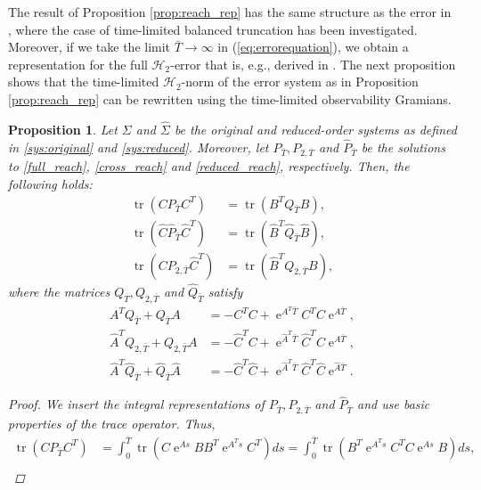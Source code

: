 \documentclass[a4paper,11pt, twoside]{article}
\newcommand{\expn}{\operatorname{e}}
\newcommand{\trace}{\operatorname{tr}}
\newtheorem{prop}[defn]{Proposition} %
\begin{document}
The result of Proposition \ref{prop:reach_rep} has the same structure as the error in \cite{redmannkuerschner}, where the case of time-limited 
balanced truncation has been investigated. Moreover, if we take the limit $\bar T\rightarrow \infty$ in (\ref{eq:errorequation}), we obtain a 
representation for the full $\mathcal{H}_2$-error that is, e.g., derived in \cite{morAnt05}. The next proposition shows that the time-limited 
$\mathcal H_2$-norm of the error system as in Proposition \ref{prop:reach_rep} can be rewritten using the time-limited observability Gramians.
\begin{prop}\label{prop:express_error_obs}
Let $\Sigma$ and $\hat \Sigma$ be the original and reduced-order systems as defined in \eqref{sys:original} and \eqref{sys:reduced}. Moreover, let 
$P_{\bar T}, P_{2, \bar T}$ and $\hat P_{\bar T}$ be the solutions to \eqref{full_reach},  \eqref{cross_reach} and \eqref{reduced_reach}, 
respectively. Then, the following holds: 
 \begin{align*}
\trace(C P_{\bar T} C^T)&=\trace(B^T Q_{\bar T} B),\\  \trace(\hat C \hat P_{\bar T} \hat C^T)&=\trace(\hat B^T \hat Q_{\bar T} \hat B),\\ 
\trace(C P_{2, \bar T} \hat C^T)&=\trace(\hat B^T Q_{2, \bar T} B),                                          
                                                             \end{align*}
 where the matrices $Q_{\bar T}, Q_{2, \bar T}$ and $\hat Q_{\bar T}$ satisfy \begin{align}\label{full_obs}
A^T Q_{\bar T}+ Q_{\bar T} A &=-C^T C+\expn^{A^T \bar T}C^T C \expn^{A \bar T},\\ \label{cross_obs}
\hat A^T Q_{2, {\bar T}}+ Q_{2, {\bar T}} A &=-\hat C^T C+\expn^{\hat A^T \bar T} \hat C^T C \expn^{A \bar T}, \\ \label{reduced_obs}
\hat A^T \hat Q_{\bar T}+\hat Q_{\bar T} \hat A &=-\hat C^T \hat C+\expn^{\hat A^T \bar T}\hat C^T \hat C \expn^{\hat A \bar T}.
                                          \end{align}
                                          \begin{proof}
We insert the integral representations of $P_{\bar T}, P_{2, \bar T}$ and $\hat P_{\bar T}$ and use basic properties of the trace operator. Thus, 
\begin{align*}
\trace(C P_{\bar T} C^T)&=\int_0^{\bar T}  \trace(C \expn^{As}BB^T \expn^{A^Ts}C^T)ds=\int_0^{\bar T}  \trace(B^T \expn^{A^Ts}C^TC \expn^{As}B)ds,\\  

\end{align*}
\end{proof}
\end{prop}
\end{document}
